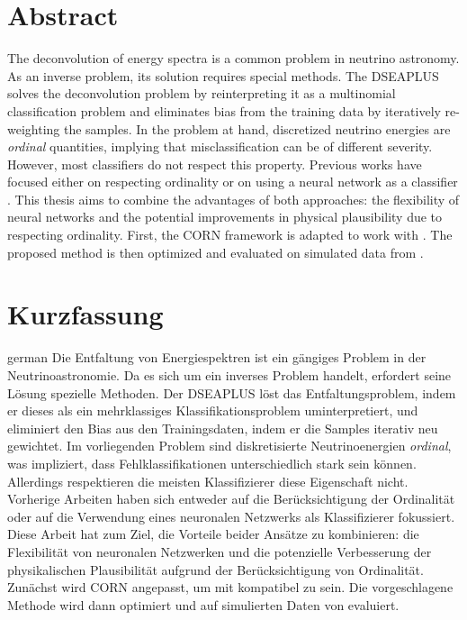 \thispagestyle{plain}

\section*{Abstract}
The deconvolution of energy spectra is a common problem in neutrino astronomy.
As an inverse problem,
  its solution requires special methods.
The \acf{DSEAPLUS} \cite{dsea_unification}
solves the deconvolution problem
  by reinterpreting it as a multinomial classification problem
and eliminates bias from the training data
  by iteratively re-weighting the samples.
%
In the problem at hand,
  discretized neutrino energies are \emph{ordinal} quantities,
    implying that misclassification can be of different severity.
However,
  most classifiers do not respect this property.
Previous works
have focused either
  on respecting ordinality \cite{dsea_jan}
  or on using a neural network as a classifier \cite{dsea_samuel}.
This thesis aims to combine the advantages of both approaches:
  the flexibility of neural networks
  and the potential improvements in physical plausibility
    due to respecting ordinality.
First,
the \ac{CORN} framework \cite{corn} is adapted to work with \dsea{}.
The proposed method is then optimized and evaluated
  on simulated data from \icecube{}.


\acresetall %
\section*{Kurzfassung}
\begin{foreignlanguage}{german}
Die Entfaltung von Energiespektren ist ein gängiges Problem in der Neutrinoastronomie.
Da es sich um ein inverses Problem handelt,
  erfordert seine Lösung spezielle Methoden.
Der \ac{DSEAPLUS} \cite{dsea_unification}
löst das Entfaltungsproblem,
  indem er dieses als ein mehrklassiges Klassifikationsproblem uminterpretiert,
und eliminiert den Bias aus den Trainingsdaten,
  indem er die Samples iterativ neu gewichtet.
%
Im vorliegenden Problem
  sind diskretisierte Neutrinoenergien \emph{ordinal},
    was impliziert, dass Fehlklassifikationen unterschiedlich stark sein können.
Allerdings
  respektieren die meisten Klassifizierer diese Eigenschaft nicht.
Vorherige Arbeiten
haben sich entweder
  auf die Berücksichtigung der Ordinalität \cite{dsea_jan}
  oder auf die Verwendung eines neuronalen Netzwerks als Klassifizierer \cite{dsea_samuel}
fokussiert.
Diese Arbeit hat zum Ziel,
  die Vorteile beider Ansätze zu kombinieren:
    die Flexibilität von neuronalen Netzwerken
    und die potenzielle Verbesserung der physikalischen Plausibilität
      aufgrund der Berücksichtigung von Ordinalität.
Zunächst wird \ac{CORN} \cite{corn} angepasst,
  um mit \dsea{} kompatibel zu sein.
Die vorgeschlagene Methode wird dann
  optimiert
  und auf simulierten Daten von \icecube{} evaluiert.
\end{foreignlanguage}

